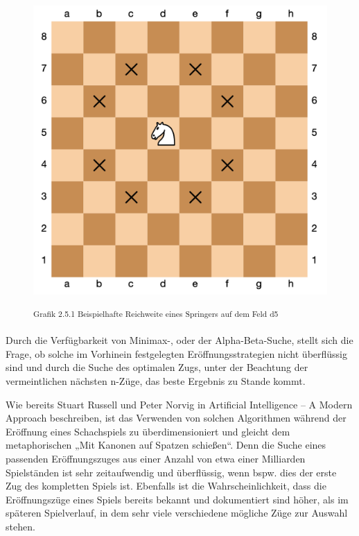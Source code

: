 \begin{figure}[h]
\centering
\includegraphics[width=\textwidth/2]{images/opening-books-strong-center-example.png}

\textsuperscript{Grafik 2.5.1 Beispielhafte Reichweite eines Springers auf dem Feld d5 \cite{}}\\
\end{figure}

Durch die Verfügbarkeit von Minimax-, oder der Alpha-Beta-Suche, stellt sich die Frage, ob solche im Vorhinein festgelegten Eröffnungsstrategien nicht überflüssig sind und durch die Suche des optimalen Zugs, unter der Beachtung der vermeintlichen nächsten n-Züge, das beste Ergebnis zu Stande kommt.

Wie bereits Stuart Russell und Peter Norvig in Artificial Intelligence – A Modern Approach beschreiben, ist das Verwenden von solchen Algorithmen während der Eröffnung eines Schachspiels zu überdimensioniert und gleicht dem metaphorischen „Mit Kanonen auf Spatzen schießen“. Denn die Suche eines passenden Eröffnungszuges aus einer Anzahl von etwa einer Milliarden Spielständen ist sehr zeitaufwendig und überflüssig, wenn bspw. dies der erste Zug des kompletten Spiels ist. Ebenfalls ist die Wahrscheinlichkeit, dass die Eröffnungszüge eines Spiels bereits bekannt und dokumentiert sind höher, als im späteren Spielverlauf, in dem sehr viele verschiedene mögliche Züge zur Auswahl stehen.


